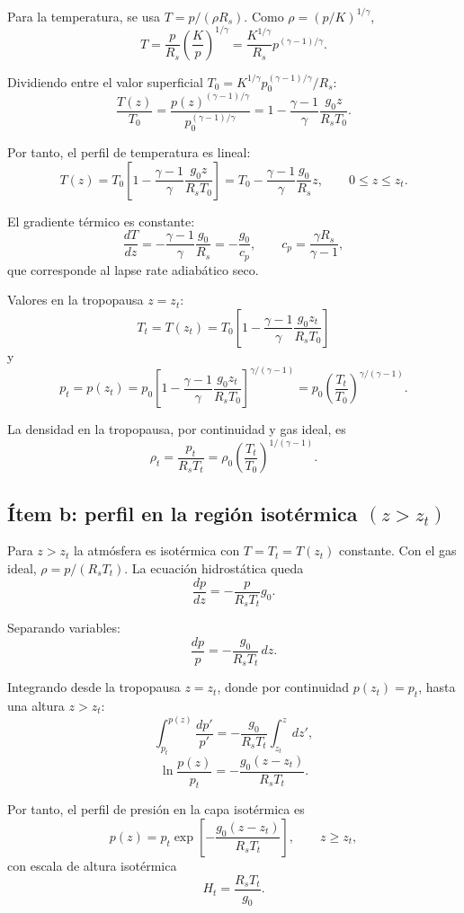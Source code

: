 \documentclass[12pt]{article}
\begin{document}
\begin{enumerate}
Para la temperatura, se usa $T=p/(\rho R_{s})$. Como $\rho=(p/K)^{1/\gamma}$,
$$T=\frac{p}{R_{s}}\left(\frac{K}{p}\right)^{1/\gamma}
=\frac{K^{1/\gamma}}{R_{s}}p^{(\gamma-1)/\gamma}.$$

Dividiendo entre el valor superficial $T_{0}=K^{1/\gamma}p_{0}^{(\gamma-1)/\gamma}/R_{s}$:
$$\frac{T(z)}{T_{0}}=\frac{p(z)^{(\gamma-1)/\gamma}}{p_{0}^{(\gamma-1)/\gamma}}
=1-\frac{\gamma-1}{\gamma}\frac{g_{0}z}{R_{s}T_{0}}.$$

Por tanto, el perfil de temperatura es lineal:
$$\boxed{\,T(z)=T_{0}\left[1-\frac{\gamma-1}{\gamma}\frac{g_{0}z}{R_{s}T_{0}}\right]
=T_{0}-\frac{\gamma-1}{\gamma}\frac{g_{0}}{R_{s}}z,\qquad 0\le z\le z_{t}.\,}$$

El gradiente térmico es constante:
$$\frac{dT}{dz}=-\frac{\gamma-1}{\gamma}\frac{g_{0}}{R_{s}}=-\frac{g_{0}}{c_{p}},
\qquad c_{p}=\frac{\gamma R_{s}}{\gamma-1},$$
que corresponde al lapse rate adiabático seco.

Valores en la tropopausa $z=z_{t}$:
$$\boxed{\,T_{t}=T(z_{t})=T_{0}\left[1-\frac{\gamma-1}{\gamma}\frac{g_{0}z_{t}}{R_{s}T_{0}}\right]\,}$$
y
$$\boxed{\,p_{t}=p(z_{t})
=p_{0}\left[1-\frac{\gamma-1}{\gamma}\frac{g_{0}z_{t}}{R_{s}T_{0}}\right]^{\gamma/(\gamma-1)}
=p_{0}\left(\frac{T_{t}}{T_{0}}\right)^{\gamma/(\gamma-1)}.\,}$$

La densidad en la tropopausa, por continuidad y gas ideal, es
$$\rho_{t}=\frac{p_{t}}{R_{s}T_{t}}=\rho_{0}\left(\frac{T_{t}}{T_{0}}\right)^{1/(\gamma-1)}.$$

\subsection{Ítem b: perfil en la región isotérmica $(z>z_{t})$}

Para $z>z_{t}$ la atmósfera es isotérmica con $T=T_{t}=T(z_{t})$ constante.
Con el gas ideal, $\rho=p/(R_{s}T_{t})$. La ecuación hidrostática queda
$$\frac{dp}{dz}=-\frac{p}{R_{s}T_{t}}g_{0}.$$

Separando variables:
$$\frac{dp}{p}=-\frac{g_{0}}{R_{s}T_{t}}\,dz.$$

Integrando desde la tropopausa $z=z_{t}$, donde por continuidad $p(z_{t})=p_{t}$, hasta una altura $z>z_{t}$:
$$\int_{p_{t}}^{p(z)}\frac{dp'}{p'}
=-\frac{g_{0}}{R_{s}T_{t}}\int_{z_{t}}^{z}dz',$$
$$\ln\frac{p(z)}{p_{t}}=-\frac{g_{0}(z-z_{t})}{R_{s}T_{t}}.$$

Por tanto, el perfil de presión en la capa isotérmica es
$$\boxed{\,p(z)=p_{t}\exp\left[-\frac{g_{0}(z-z_{t})}{R_{s}T_{t}}\right],
\qquad z\ge z_{t},\,}$$
con escala de altura isotérmica
$$H_{t}=\frac{R_{s}T_{t}}{g_{0}}.$$


\end{enumerate}
\end{document}
